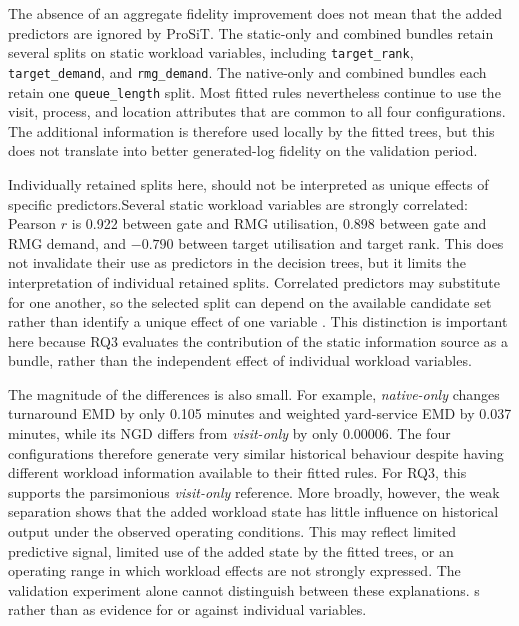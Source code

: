 The absence of an aggregate fidelity improvement does not mean that the added
predictors are ignored by ProSiT. The static-only and combined bundles retain
several splits on static workload variables, including
\texttt{target\_rank}, \texttt{target\_demand}, and
\texttt{rmg\_demand}. The native-only and combined bundles each retain one
\texttt{queue\_length} split. Most fitted rules nevertheless continue to use
the visit, process, and location attributes that are common to all four
configurations. The additional information is therefore used locally by the
fitted trees, but this does not translate into better generated-log fidelity
on the validation period.

Individually retained splits here, should not be interpreted as unique effects of
specific predictors.Several static workload variables are strongly correlated: Pearson $r$ is
0.922 between gate and RMG utilisation, 0.898 between gate and RMG demand,
and $-0.790$ between target utilisation and target rank. This does not
invalidate their use as predictors in the decision trees, but it limits the
interpretation of individual retained splits. Correlated predictors may
substitute for one another, so the selected split can depend on the available
candidate set rather than identify a unique effect of one variable \cite{SimulationGuidedRepair2025}. This
distinction is important here because RQ3 evaluates the contribution of the
static information source as a bundle, rather than the independent effect of
individual workload variables.

The magnitude of the differences is also small. For example,
\textit{native-only} changes turnaround EMD by only 0.105 minutes and weighted
yard-service EMD by 0.037 minutes, while its NGD differs from
\textit{visit-only} by only 0.00006. The four configurations therefore generate
very similar historical behaviour despite having different workload information
available to their fitted rules. For RQ3, this supports the parsimonious
\textit{visit-only} reference. More broadly, however, the weak separation shows
that the added workload state has little influence on historical output under
the observed operating conditions. This may reflect limited predictive signal,
limited use of the added state by the fitted trees, or an operating range in
which workload effects are not strongly expressed. The validation experiment
alone cannot distinguish between these explanations.
s rather than as evidence for or against individual variables.

\medskip

